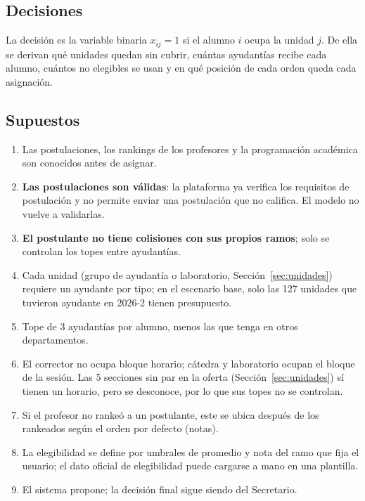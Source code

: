 \documentclass{article}
\begin{document}
\subsection{Decisiones}

La decisión es la variable binaria $x_{ij} = 1$ si el alumno $i$ ocupa la unidad $j$. De ella se derivan qué unidades quedan sin cubrir, cuántas ayudantías recibe cada alumno, cuántos no elegibles se usan y en qué posición de cada orden queda cada asignación.

\subsection{Supuestos}
\label{sec:supuestos}

\begin{enumerate}
    \item Las postulaciones, los rankings de los profesores y la programación académica son conocidos antes de asignar.
    \item \textbf{Las postulaciones son válidas}: la plataforma ya verifica los requisitos de postulación y no permite enviar una postulación que no califica. El modelo no vuelve a validarlas.
    \item \textbf{El postulante no tiene colisiones con sus propios ramos}; solo se controlan los topes entre ayudantías.
    \item Cada unidad (grupo de ayudantía o laboratorio, Sección~\ref{sec:unidades}) requiere un ayudante por tipo; en el escenario base, solo las 127 unidades que tuvieron ayudante en 2026-2 tienen presupuesto.
    \item Tope de 3 ayudantías por alumno, menos las que tenga en otros departamentos.
    \item El corrector no ocupa bloque horario; cátedra y laboratorio ocupan el bloque de la sesión. Las 5 secciones sin par en la oferta (Sección~\ref{sec:unidades}) sí tienen un horario, pero se desconoce, por lo que sus topes no se controlan.
    \item Si el profesor no rankeó a un postulante, este se ubica después de los rankeados según el orden por defecto (notas).
    \item La elegibilidad se define por umbrales de promedio y nota del ramo que fija el usuario; el dato oficial de elegibilidad puede cargarse a mano en una plantilla.
    \item El sistema propone; la decisión final sigue siendo del Secretario.
\end{enumerate}
\end{document}
